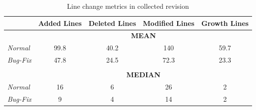 \begin{table}[H]
	\centering
	\caption{Line change metrics in collected revision}
	\label{rev_lines}
	\begin{tabular}{@{}lcccc@{}}
		\toprule
		& \multicolumn{1}{l}{\textbf{Added Lines}} & \multicolumn{1}{l}{\textbf{Deleted Lines}} & \multicolumn{1}{l}{\textbf{Modified Lines}} & \multicolumn{1}{l}{\textbf{Growth Lines}} \\ \midrule
		& \multicolumn{4}{c}{\textbf{MEAN}}                                                                                                                                               \\
		\textit{Normal}  & 99.8                                     & 40.2                                       & 140                                         & 59.7                                      \\
		\textit{Bug-Fix} & 47.8                                     & 24.5                                       & 72.3                                        & 23.3                                      \\
		& \multicolumn{1}{l}{}                     & \multicolumn{1}{l}{}                       & \multicolumn{1}{l}{}                        & \multicolumn{1}{l}{}                      \\
		& \multicolumn{4}{c}{\textbf{MEDIAN}}                                                                                                                                             \\
		\textit{Normal}  & 16                                       & 6                                          & 26                                          & 2                                         \\
		\textit{Bug-Fix} & 9                                        & 4                                          & 14                                          & 2                                         \\ \bottomrule
	\end{tabular}
\end{table}

